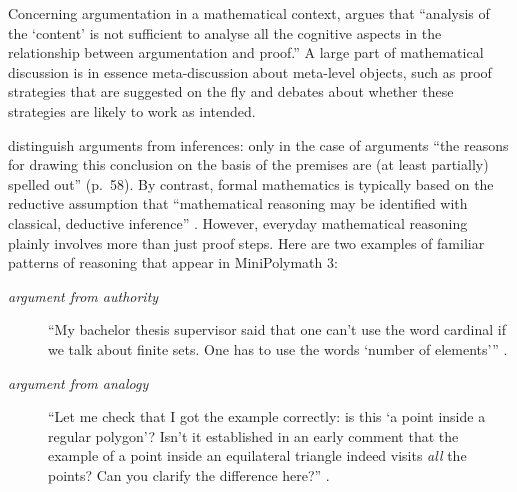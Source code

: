 \documentclass[smallextended,oneside]{svjour3}       %
\let\cite\citep
\begin{document}
Concerning argumentation in a mathematical context, \citet[p.~39]{pedemonte2007} argues that
``analysis of the `content' is not sufficient to analyse all the cognitive aspects in
the relationship between argumentation and proof.''
A large part of mathematical discussion is in essence meta-discussion
about meta-level objects, such as proof strategies that are
suggested on the fly and debates about whether these strategies are
likely to work as intended.

\citet{mercier2011humans} distinguish
arguments from inferences: 
only in the case of arguments ``the reasons for drawing this
conclusion on the basis of the premises are (at least partially)
spelled out'' (p.~58).   
By contrast, formal mathematics is typically based on the reductive assumption that
``mathematical reasoning may be identified with classical, deductive
inference'' \cite[p.~25]{aliseda2003mathematical}.
However, everyday mathematical reasoning plainly involves more than just proof steps.
Here are two examples of familiar patterns of reasoning that appear in MiniPolymath 3:
\begin{description}
\item[\emph{argument from authority}]
``My bachelor thesis supervisor said that one can't use the word cardinal if we talk about finite sets. One has to use the words `number of elements'{''}
\cite[\href{https://wp.me/pAG2F-41\#comment-3418}{19 July, 9:46 pm}]{tao2011imo}.
\item[\emph{argument from analogy}]
``Let me check that I got the example correctly: is this `a point inside a regular polygon'? Isn't it established in an early comment that the example of a point inside an equilateral triangle indeed visits \emph{all} the points? Can you clarify the difference here?''
\cite[\href{https://wp.me/pAG2F-41\#comment-3378}{19 July, 9:19 pm}]{tao2011imo}.
\end{description}

\end{document}
